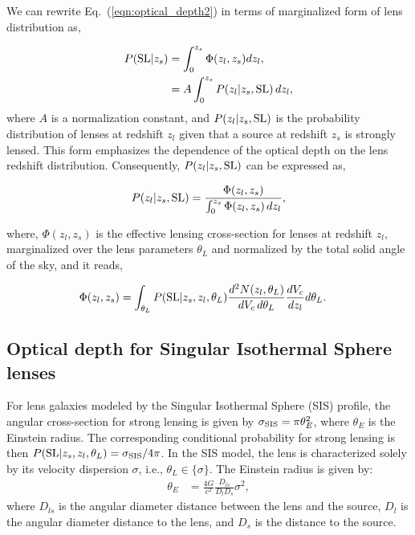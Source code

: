 \documentclass[aps,prd,twocolumn,superscriptaddress,groupedaddress,nofootinbib,showpacs,eqsecnum]{revtex4-1}
\begin{document}
We can rewrite Eq.~(\ref{eqn:optical_depth2}) in terms of marginalized form of lens distribution as, 

\begin{align}
P({\rm SL}|z_s) &= \int_{0}^{z_s} \Phi(z_l, z_s) dz_l,\\
&= A \int_{0}^{z_s} P(z_l|z_s, {\rm SL}) \, dz_l,
\label{eqn:optical_depth3}\end{align}
where $A$ is a normalization constant, and $P(z_l|z_s, {\rm SL})$ is the probability distribution of lenses at redshift $z_l$ given that a source at redshift $z_s$ is strongly lensed. This form emphasizes the dependence of the optical depth on the lens redshift distribution. Consequently, $P(z_l|z_s, {\rm SL})$ can be expressed as,

\begin{align}
P(z_l|z_s, {\rm SL}) &= \frac{\Phi(z_l, z_s)}{\int_0^{z_s} \Phi(z_l, z_s) \, dz_l},\label{eqn:prob_lens_redshift}\\
\end{align}

where, $\Phi(z_l, z_s)$ is the effective lensing cross-section for lenses at redshift $z_l$, marginalized over the lens parameters $\theta_L$ and normalized by the total solid angle of the sky, and it reads,

\begin{align}
\Phi(z_l, z_s) &= \int_{\theta_L} P({\rm SL}|z_s, z_l, \theta_L) \frac{d^2N(z_l, \theta_L)}{dV_c \, d\theta_L} \frac{dV_c}{dz_l} d\theta_L.
 \label{eqn:phi}\end{align}

\subsection{Optical depth for Singular Isothermal Sphere lenses}\label{sec:sis_tau}

For lens galaxies modeled by the Singular Isothermal Sphere (SIS) profile, the angular cross-section for strong lensing is given by $\sigma_{\rm SIS} = \pi \theta_E^2$, where $\theta_E$ is the Einstein radius. The corresponding conditional probability for strong lensing is then $P({\rm SL}|z_s, z_l, \theta_L) = \sigma_{\rm SIS} / 4\pi$. In the SIS model, the lens is characterized solely by its velocity dispersion $\sigma$, i.e., $\theta_L \in \{\sigma\}$. The Einstein radius is given by:
\begin{align}
\theta_E &= \frac{4G}{c^2} \frac{D_{ls}}{D_l D_s} \sigma^2,
 \label{eqn:theta_E}\end{align}
where $D_{ls}$ is the angular diameter distance between the lens and the source, $D_l$ is the angular diameter distance to the lens, and $D_s$ is the distance to the source.
\end{document}
